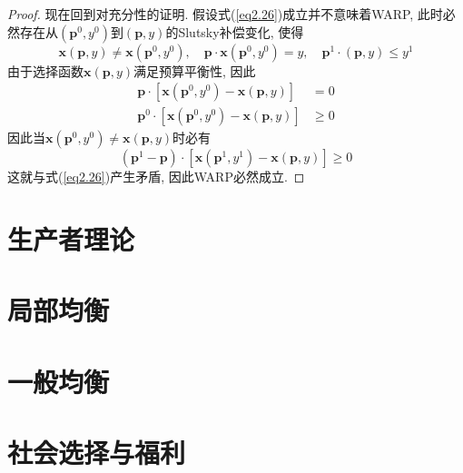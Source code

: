 \documentclass[cn, 12pt, math=mtpro2, bibstyle=apa, blue, twocol]{elegantbook}
\newcommand{\p}{\mathbf{p}}
\newcommand{\x}{\mathbf{x}}
\begin{document}
\begin{proof}
  现在回到对充分性的证明. 假设式(\ref{eq2.26})成立并不意味着WARP, 此时必然存在从$(\p^0,y^0)$到$(\p,y)$的Slutsky补偿变化, 使得
  $$\x(\p,y)\neq \x(\p^0,y^0),\quad \p\cdot\x(\p^0,y^0)=y,\quad \p^1\cdot(\p,y)\leq y^1$$
  由于选择函数$\x(\p,y)$满足预算平衡性, 因此
  \begin{align*}
  \p\cdot[\x(\p^0,y^0)-\x(\p,y)]&=0 \\
  \p^0\cdot [\x(\p^0,y^0)-\x(\p,y)]&\ge0
  \end{align*}
  因此当$\x(\p^0,y^0)\neq \x(\p,y)$时必有
  $$(\p^1-\p)\cdot [\x(\p^1,y^1)-\x(\p,y)]\geq 0$$
  这就与式(\ref{eq2.26})产生矛盾, 因此WARP必然成立.
  \end{proof}

\chapter{生产者理论}

\chapter{局部均衡}

\chapter{一般均衡}

\chapter{社会选择与福利}
\end{document}
